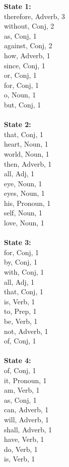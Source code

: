 \begin{multicols}{4}
\noindent\textbf{State 1:}\\
therefore, Adverb, 3\\
without, Conj, 2\\
as, Conj, 1\\
against, Conj, 2\\
how, Adverb, 1\\
since, Conj, 1\\
or, Conj, 1\\
for, Conj, 1\\
o, Noun, 1\\
but, Conj, 1\\
\\
\noindent\textbf{State 2:} \\
that, Conj, 1\\
heart, Noun, 1\\
world, Noun, 1\\
then, Adverb, 1\\
all, Adj, 1\\
eye, Noun, 1\\
eyes, Noun, 1\\
his, Pronoun, 1\\
self, Noun, 1\\
love, Noun, 1\\
\\
\noindent\textbf{State 3:} \\
for, Conj, 1\\
by, Conj, 1\\
with, Conj, 1\\
all, Adj, 1\\
that, Conj, 1\\
is, Verb, 1\\
to, Prep, 1\\
be, Verb, 1\\
not, Adverb, 1\\
of, Conj, 1\\
\\
\noindent\textbf{State 4:} \\
of, Conj, 1\\
it, Pronoun, 1\\
am, Verb, 1\\
as, Conj, 1\\
can, Adverb, 1\\
will, Adverb, 1\\
shall, Adverb, 1\\
have, Verb, 1\\
do, Verb, 1\\
is, Verb, 1\\

\end{multicols}
